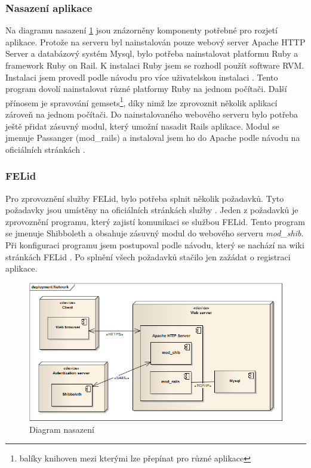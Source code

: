 \subsubsection{Nasazení aplikace}
Na diagramu nasazení \ref{fig:deployment} jsou znázorněny komponenty potřebné pro rozjetí aplikace. Protože na serveru byl nainstalován pouze webový server Apache HTTP Server a databázový systém Mysql, bylo potřeba nainstalovat platformu Ruby a framework Ruby on Rail. K instalaci Ruby jsem se rozhodl použít software RVM. Instalaci jsem provedl podle návodu pro více uživatelskou instalaci \cite{RVM}. Tento program dovolí nainstalovat různé platformy Ruby na jednom počítači. Další přínosem je spravování gemsets\footnote{balíky knihoven mezi kterými lze přepínat pro různé aplikace}, díky nimž lze zprovoznit několik aplikací zároveň na jednom počítači. Do nainstalovaného webového serveru bylo potřeba ještě přidat zásuvný modul, který umožní nasadit Rails aplikace. Modul se jmenuje Passanger (mod\_rails) a instaloval jsem ho do Apache podle návodu na oficiálních stránkách \cite{passenger}.

\subsubsection{FELid}
Pro zprovoznění služby FELid, bylo potřeba splnit několik požadavků. Tyto požadavky jsou umístěny na oficiálních stránkách služby \cite{felid_pozadavky}. Jeden z požadavků je zprovoznění programu, který zajistí komunikaci se službou FELid. Tento program se jmenuje Shibboleth a obsahuje zásuvný modul do webového serveru \textit{mod\_shib}. Při konfiguraci programu jsem postupoval podle návodu, který se nachází na wiki stránkách FELid \citep{felid}. Po splnění všech požadavků stačilo jen zažádat o registraci aplikace.

\begin{figure}[h]
\begin{center}
\includegraphics[width=12cm]{figures/deployment}
\caption{Diagram nasazení}
\label{fig:deployment}
\end{center}
\end{figure}

